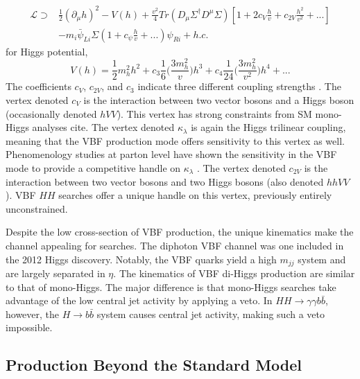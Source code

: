 \begin{equation}
    \begin{aligned}
    \mathcal{L} \supset &\frac{1}{2}(\partial_{\mu} h)^2 -V(h) + \frac{v^2}{4} Tr(D_{\mu}\Sigma^\dagger D^\mu \Sigma) [1 + 2c_{V} \frac{h}{v} + c_{2V} \frac{h^2}{v^2} + ...] \\
     &- m_i\bar{\psi}_{Li}\Sigma(1+c_{\psi}\frac{h}{v}+...)\psi_{Ri} + h.c.
    \end{aligned}
\end{equation}
for Higgs potential,
\begin{equation}
    V(h) = \frac{1}{2}m_h^2h^2 +c_3 \frac{1}{6}\bigg(\frac{3m_h^2}{v}\bigg)h^3 + c_4 \frac{1}{24}\bigg(\frac{3m_h^2}{v^2}\bigg)h^4+...
\end{equation}
The coefficients $c_V$, $c_{2V}$, and $c_3$ indicate three different coupling strengths \cite{vbfhh}. The vertex denoted $c_V$ is the interaction between two vector bosons and a Higgs boson (occasionally denoted $hVV$). This vertex has strong constraints from \gls{SM} mono-Higgs analyses {\color{red} cite}. The vertex denoted $\kappa_{\lambda}$ is again the Higgs trilinear coupling, meaning that the \gls{VBF} production mode offers sensitivity to this vertex as well. Phenomenology studies at parton level have shown the sensitivity in the \gls{VBF} mode to provide a competitive handle on $\kappa_{\lambda}$ \cite{vbf_lambda}. The vertex denoted $c_{2V}$ is the interaction between two vector bosons and two Higgs bosons (also denoted $hhVV$). \gls{VBF} $HH$ searches offer a unique handle on this vertex, previously entirely unconstrained.

Despite the low cross-section of \gls{VBF} production, the unique kinematics make the channel appealing for searches. The diphoton \gls{VBF} channel was one included in the 2012 Higgs discovery. Notably, the \gls{VBF} quarks yield a high $m_{jj}$ system and are largely separated in $\eta$. The kinematics of \gls{VBF} di-Higgs production are similar to that of mono-Higgs. The major difference is that mono-Higgs searches take advantage of the low central jet activity by applying a veto. In $HH \rightarrow \gamma \gamma b\bar{b}$, however, the $H \rightarrow b\bar{b}$ system causes central jet activity, making such a veto impossible.


\subsection{Production Beyond the Standard Model}

